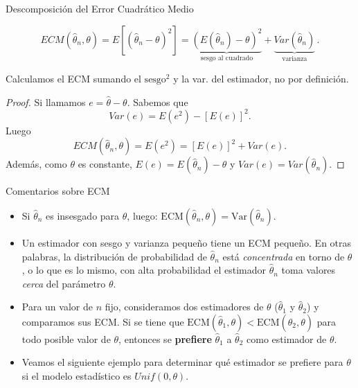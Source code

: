 \documentclass{beamer}
\theoremstyle{definition}
\begin{document}
\begin{frame}{\color{rosee}Descomposición del Error Cuadr\'atico Medio} \small
  \begin{theorem}
    \[ECM(\widehat{\theta}_n,\theta)=E\left[ \left(\widehat{\theta}_n - \theta\right)^{2} \right] =
    \underbrace{\left(E(\widehat{\theta}_n)-\theta\right)^{2}}_{\text{sesgo al cuadrado}} + \underbrace{Var(\widehat{\theta}_n)}_{\text{varianza}}\,.\]
  \end{theorem}
 Calculamos el ECM sumando el $\text{sesgo}^2$ y la var. del estimador, no por definición.
  
  \begin{proof}
    Si llamamos $e = \widehat{\theta} - \theta$. Sabemos que
    \[Var(e) = E\left(e^{2}\right) - \left[E(e)\right]^{2}.\]
    Luego
    \[ ECM(\widehat{\theta}_n,\theta)=E\left(e^{2}\right) = \left[ E(e)\right]^{2} + Var(e).\]
    Adem\'as, como $\theta$ es constante, $E(e) = E(\widehat{\theta}_n) - \theta$ y
    $Var(e) = Var(\widehat{\theta}_n)$.
  \end{proof}
\end{frame}


\begin{frame}{\color{rosee}Comentarios sobre ECM}

  \begin{itemize}
   \item Si $\widehat{\theta}_n$ es insesgado para $\theta$, luego: $\text{ECM}(\widehat{\theta}_n,\theta) = \text{Var}(\widehat{\theta}_n)$.
    \item Un estimador con sesgo y varianza pequeño tiene un ECM pequeño. En otras palabras, la distribución de probabilidad de  $\widehat{\theta}_n$ está \textit{concentrada} en torno de  $\theta$, o lo que es lo mismo, con alta probabilidad el estimador $\widehat{\theta}_n$ toma valores \textit{cerca} del parámetro $\theta$.\medskip
 
    \item Para un valor de $n$ fijo, consideramos dos estimadores de $\theta$ ($\widehat{\theta}_{1}$ y $\widehat{\theta}_{2}$) y comparamos sus ECM. Si se tiene que $\text{ECM}(\widehat{\theta}_{1},\theta) <\text{ECM}(\widehat{\theta}_{2},\theta)$ para todo posible valor de $\theta$, entonces se \textbf{prefiere} $\widehat{\theta}_{1}$ a $\widehat{\theta}_{2}$ como estimador de $\theta$. 
    

     \item Veamos el siguiente ejemplo para determinar qué estimador se prefiere para $\theta$ si el modelo estadístico es $Unif(0,\theta)$.
      
 
      \end{itemize}
      

\end{frame}
\end{document}
